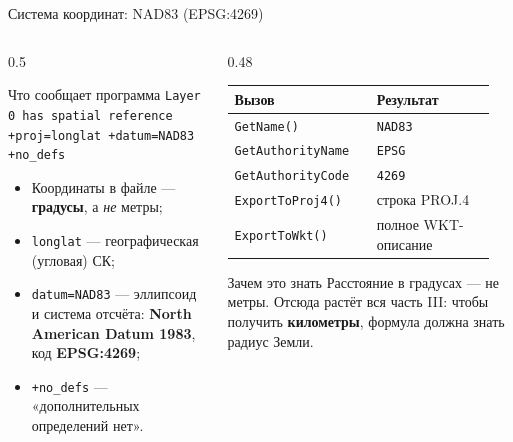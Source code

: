 \documentclass[aspectratio=169,10pt]{beamer}
\newcommand{\out}[1]{\textcolor{black!80}{\scriptsize\texttt{#1}}}
\begin{document}
\begin{frame}{Система координат: NAD83 (EPSG:4269)}
\footnotesize
\begin{columns}[T,onlytextwidth]
  \begin{column}{0.5\textwidth}
    \begin{block}{Что сообщает программа}\small
      \out{Layer 0 has spatial reference}\\
      \out{+proj=longlat +datum=NAD83 +no\_defs}
    \end{block}
    \vspace{0.2em}
    \begin{itemize}\itemsep1pt
      \item Координаты в файле --- \textbf{градусы}, а \emph{не} метры;
      \item \texttt{longlat} --- географическая (угловая) СК;
      \item \texttt{datum=NAD83} --- эллипсоид и система отсчёта:
            \textbf{North American Datum 1983}, код \textbf{EPSG:4269};
      \item \texttt{+no\_defs} --- «дополнительных определений нет».
    \end{itemize}
  \end{column}
  \begin{column}{0.48\textwidth}
    \begin{tabular}{@{}p{0.5\linewidth}p{0.42\linewidth}@{}}
      \toprule
      Вызов & Результат \\
      \midrule
      \texttt{GetName()}        & \texttt{NAD83} \\
      \texttt{GetAuthorityName} & \texttt{EPSG} \\
      \texttt{GetAuthorityCode} & \texttt{4269} \\
      \texttt{ExportToProj4()}  & строка PROJ.4 \\
      \texttt{ExportToWkt()}   & полное WKT-описание \\
      \bottomrule
    \end{tabular}
    \vspace{0.5em}
    \begin{alertblock}{Зачем это знать}\small
      Расстояние в градусах --- не метры. Отсюда растёт вся часть III:
      чтобы получить \textbf{километры}, формула должна знать радиус Земли.
    \end{alertblock}
  \end{column}
\end{columns}
\end{frame}
\end{document}
